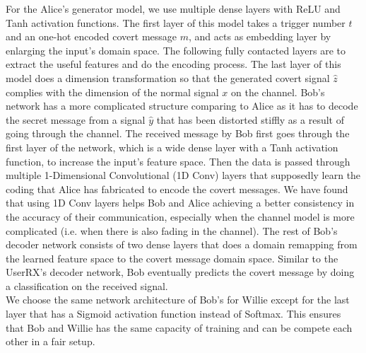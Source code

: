 For the Alice's generator model, we use multiple dense layers with ReLU and Tanh activation functions. The first layer of this model takes a trigger number \(t\) and an one-hot encoded covert message \(m\), and acts as embedding layer by enlarging the input's domain space. The following fully contacted layers are to extract the useful features and do the encoding process. The last layer of this model does a dimension transformation so that the generated covert signal \(\hat{z}\) complies with the dimension of the normal signal \(x\) on the channel. Bob's network has a more complicated structure comparing to Alice as it has to decode the secret message from a signal \(\hat{y}\) that has been distorted stiffly as a result of going through the channel. The received message by Bob first goes through the first layer of the network, which is a wide dense layer with a Tanh activation function, to increase the input's feature space. Then the data is passed through multiple 1-Dimensional Convolutional (1D Conv) layers that supposedly learn the coding that Alice has fabricated to encode the covert messages. We have found that using 1D Conv layers helps Bob and Alice achieving a better consistency in the accuracy of their communication, especially when the channel model is more complicated (i.e. when there is also fading in the channel). The rest of Bob's decoder network consists of two dense layers that does a domain remapping from the learned feature space to the covert message domain space. Similar to the UserRX's decoder network, Bob eventually predicts the covert message by doing a classification on the received signal.\\
We choose the same network architecture of Bob's for Willie except for the last layer that has a Sigmoid activation function instead of Softmax. This ensures that Bob and Willie has the same capacity of training and can be compete each other in a fair setup.